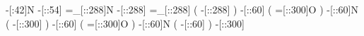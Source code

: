        -[:42]N%
      -[::54]%
    =_[::288]N%
     -[::288]%
    =_[::288]%
                (
         -[::288]\phantom{N}%
                )
      -[::60]%
                (
         =[::300]O%
                )
      -[::60]N%
                (
         -[::300]%
                )
      -[::60]%
                (
         =[::300]O%
                )
      -[::60]N%
                (
          -[::60]%
                )
     -[::300]%